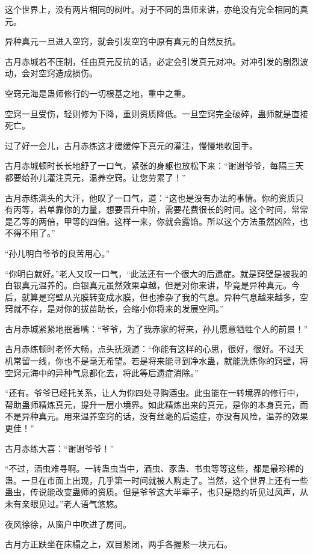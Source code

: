 \begin{this_body}
这个世界上，没有两片相同的树叶。对于不同的蛊师来讲，亦绝没有完全相同的真元。

异种真元一旦进入空窍，就会引发空窍中原有真元的自然反抗。

古月赤城若不压制，任由真元反抗的话，必定会引发真元对冲。对冲引发的剧烈波动，会对空窍造成损伤。

空窍元海是蛊师修行的一切根基之地，重中之重。

空窍一旦受伤，轻则修为下降，重则资质降低。一旦空窍完全破碎，蛊师就是直接死亡。

过了好一会儿，古月赤练这才缓缓停下真元的灌注，慢慢地收回手。

古月赤城顿时长长地舒了一口气，紧张的身躯也放松下来：“谢谢爷爷，每隔三天都要给孙儿灌注真元，温养空窍。让您劳累了！”

古月赤练满头的大汗，他叹了一口气，道：“这也是没有办法的事情。你的资质只有丙等，若单靠你的力量，想要晋升中阶，需要花费很长的时间。这个时间，常常是乙等的两倍，甲等的四倍。这样一来，你就会露馅。所以这个方法虽然凶险，也不得不用了。”

“孙儿明白爷爷的良苦用心。”

“你明白就好。”老人又叹一口气，“此法还有一个很大的后遗症。就是窍壁是被我的白银真元温养的。白银真元虽然效果卓越，但是对你来讲，毕竟是异种真元。今后，就算是窍壁从光膜转变成水膜，但也掺杂了我的气息。异种气息越来越多，空窍就不存，是对你的拔苗助长，会缩小你将来的发展空间。”

古月赤城紧紧地抿着嘴：“爷爷，为了我赤家的将来，孙儿愿意牺牲个人的前景！”

古月赤练顿时老怀大畅，点头抚须道：“你能有这样的心思，很好，很好。不过天机常留一线，你也不是毫无希望。若是将来能寻到净水蛊，就能洗练你的窍壁，将空窍元海中的异种气息都化去，将此等后遗症消除。”

“还有。爷爷已经托关系，让人为你四处寻购酒虫。此虫能在一转境界的修行中，帮助蛊师精炼真元，提升一层小境界。如此精炼出来的真元，是你的本身真元，而不是异种真元。用来温养空窍的话，没有丝毫的后遗症，亦没有风险，温养的效果更佳！”

古月赤练大喜：“谢谢爷爷！”

“不过，酒虫难寻啊。一转蛊虫当中，酒虫、豕蛊、书虫等等这些，都是最珍稀的蛊。一旦在市面上出现，几乎第一时间就被人购走了。当然，这个世界上还有一些蛊虫，传说能改变蛊师的资质。但是爷爷这大半辈子，也只是隐约听见过风声，从未有亲眼见过。”老人语气悠悠。

夜风徐徐，从窗户中吹进了房间。

古月方正趺坐在床榻之上，双目紧闭，两手各握紧一块元石。


\end{this_body}
